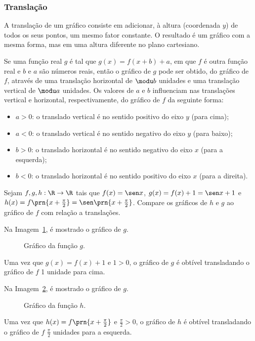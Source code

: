\subsubsection{Translação}

A translação de um gráfico consiste em adicionar, à altura (coordenada $y$) de todos os seus pontos, um mesmo fator constante.
O resultado é um gráfico com a mesma forma, mas em uma altura diferente no plano cartesiano.

Se uma função real $g$ é tal que $g(x) = f(x+b) +a$, em que $f$ é outra função real e $b$ e $a$ são números reais,
então o gráfico de $g$ pode ser obtido, do gráfico de $f$, através
de uma translação horizontal de $\modu b$ unidades e uma
translação vertical de $\modu a$ unidades.
Os valores de $a$ e $b$ influenciam nas translações vertical e horizontal, respectivamente, do gráfico de $f$ da seguinte forma:

\begin{itemize}
  \item $a > 0$: o translado vertical é no sentido positivo do eixo $y$ (para cima);
  \item $a < 0$: o translado vertical é no sentido negativo do eixo $y$ (para baixo);
  \item $b > 0$: o translado horizontal é no sentido negativo do eixo $x$ (para a esquerda);
  \item $b < 0$: o translado horizontal é no sentido positivo do eixo $x$ (para a direita).
\end{itemize}

\begin{example}
Sejam $f,g,h:\R \to \R$ tais que $f(x) = \sen x$, $g(x) = f(x) + 1 = \sen x +1$ e $h(x)= f\prn{x+\frac {\pi} 2}= \sen \prn{x+ \frac {\pi} 2}$.
Compare os gráficos de $h$ e $g$ ao gráfico de $f$ com relação a translações.
\end{example}

\begin{solution}
Na Imagem~\ref{img:grafico-translacao-exemplo-g}, é mostrado o gráfico de $g$.
%
  \begin{figure}
    \centering
    
    \caption{Gráfico da função $g$.}
    \label{img:grafico-translacao-exemplo-g}
  \end{figure}
%
\noindent Uma vez que $g(x) = f(x)+1$ e $1>0$, o gráfico de $g$ é obtível transladando o gráfico de $f$ 1 unidade para cima.

Na Imagem~\ref{img:grafico-translacao-exemplo-h}, é mostrado o gráfico de $g$.
%
  \begin{figure}
    \centering
    
    \caption{Gráfico da função $h$.}
    \label{img:grafico-translacao-exemplo-h}
  \end{figure}
%
\noindent Uma vez que $h(x) = f\prn{x+\frac {\pi} 2}$ e $\frac {\pi} 2>0$, o gráfico de $h$ é obtível transladando o gráfico de $f$ $\frac {\pi} 2$ unidades para a esquerda.
\end{solution}    